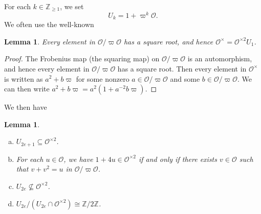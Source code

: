 \documentclass[10pt, letterpaper]{amsart}
\theoremstyle{plain}
\newtheorem{Lem}[equation]{Lemma}
\theoremstyle{definition}
\numberwithin{equation}{section}
\newcommand{\Z}{\mathbb{Z}}
\newcommand{\Ocal}{\mathcal{O}}
\begin{document}
For each $k\in\Z_{\geq 1}$, we set
\[
U_k=1+\varpi^k\Ocal.
\]
We often use the well-known
\begin{Lem}\label{L:square_root_exits_in_redidue_field}
Every element in $\Ocal\slash\varpi\Ocal$ has a square root, and hence $\Ocal^\times=\Ocal^{\times 2}U_1$.
\end{Lem}
\begin{proof}
The Frobenius map (the squaring map) on $\Ocal\slash\varpi\Ocal$ is an automorphism, and hence every element in $\Ocal\slash\varpi\Ocal$ has a square root. Then every element in $\Ocal^\times$ is written as $a^2+b\varpi$ for some nonzero $a\in\Ocal\slash\varpi\Ocal$ and some $b\in \Ocal\slash\varpi\Ocal$. We can then write $a^2+b\varpi=a^2(1+a^{-2}b\varpi)$.
\end{proof}

We then have
\begin{Lem}\label{L:2-adic_arithmetic}
\quad
\begin{enumerate}[(a)]
\item $U_{2e+1}\subseteq \Ocal^{\times 2}$.
\item\label{Val2eSqrs} For each $u\in\Ocal$, we have $1+4u\in\Ocal^{\times 2}$ if and only if there exists $v\in \Ocal$ such that $v+v^2=u$ in $\Ocal\slash\varpi\Ocal$.
\item $U_{2e}\nsubseteq\Ocal^{\times 2}$.
\item $U_{2e}\slash (U_{2e}\cap\Ocal^{\times 2})\cong\Z\slash 2\Z$.
\end{enumerate}
\end{Lem}
\end{document}
